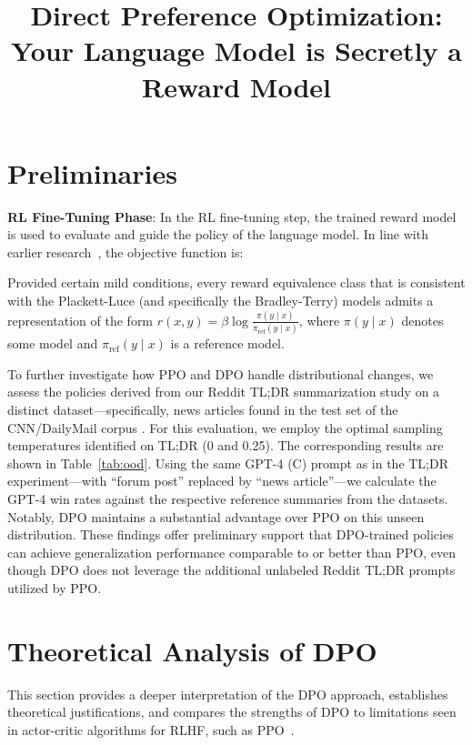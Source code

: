 \title{Direct Preference Optimization: Your Language Model is Secretly a Reward Model}
\section{Preliminaries}\label{section:prelims}

\textbf{RL Fine-Tuning Phase}: In the RL fine-tuning step, the trained reward model is used to evaluate and guide the policy of the language model. In line with earlier research~\citep{jaques2017sequence, jaques2020human}, the objective function is:

\begin{theorem}\label{thm:main}
    Provided certain mild conditions, every reward equivalence class that is consistent with the Plackett-Luce (and specifically the Bradley-Terry) models admits a representation of the form ${r(x, y) = \beta \log \frac{\pi(y\mid x)}{\pi_\text{ref}(y\mid x)}}$, where $\pi(y\mid x)$ denotes some model and $\pi_\text{ref}(y \mid x)$ is a reference model.
\end{theorem}

To further investigate how PPO and DPO handle distributional changes, we assess the policies derived from our Reddit TL;DR summarization study on a distinct dataset—specifically, news articles found in the test set of the CNN/DailyMail corpus \citep{nallapati-etal-2016-abstractive}. For this evaluation, we employ the optimal sampling temperatures identified on TL;DR (0 and 0.25). The corresponding results are shown in Table~\ref{tab:ood}. Using the same GPT-4 (C) prompt as in the TL;DR experiment—with ``forum post'' replaced by ``news article''—we calculate the GPT-4 win rates against the respective reference summaries from the datasets. Notably, DPO maintains a substantial advantage over PPO on this unseen distribution. These findings offer preliminary support that DPO-trained policies can achieve generalization performance comparable to or better than PPO, even though DPO does not leverage the additional unlabeled Reddit TL;DR prompts utilized by PPO.

\section{Theoretical Analysis of DPO} This section provides a deeper interpretation of the DPO approach, establishes theoretical justifications, and compares the strengths of DPO to limitations seen in actor-critic algorithms for RLHF, such as PPO~\cite{schulman2017proximal}.

